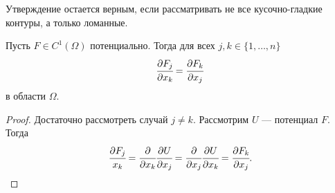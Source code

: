 \begin{Comment}
Утверждение остается верным, если рассматривать не все кусочно-гладкие контуры, а только ломанные.
\end{Comment}

\begin{Statement}
    Пусть $F \in C^1(\Omega)$ потенциально. Тогда для всех $j,k \in \{1, \ldots, n\}$
    $$
        \cfrac{\partial F_j}{\partial x_k} = \cfrac{\partial F_k}{\partial x_j}
    $$
    в области $\Omega$.
\end{Statement}
\begin{proof}
    Достаточно рассмотреть случай $j\neq k$. Рассмотрим $U$ --- потенциал $F$. Тогда
    $$
        \cfrac{\partial F_j}{x_k} = \cfrac{\partial}{\partial x_k}\cfrac{\partial U}{\partial x_j} = \cfrac{\partial}{\partial x_j}\cfrac{\partial U}{\partial x_k} = \cfrac{\partial F_k}{\partial x_j}.
    $$
\end{proof}